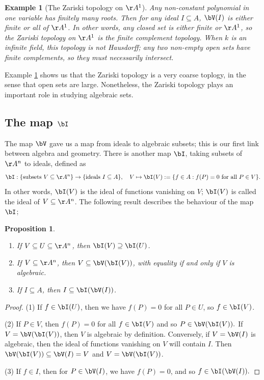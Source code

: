 \documentclass[12pt]{amsart}
\theoremstyle{plain}
\newtheorem{proposition}[theorem]{Proposition}
\newtheorem{example}[theorem]{Example}
\begin{document}
\begin{example}[The Zariski topology on $\AA^1$]\label{zariskia1}
Any non-constant polynomial in one variable has finitely many roots.
Then for any ideal $I \subseteq A$, $\bV(I)$ is either finite or all of $\AA^1$.
In other words, any closed set is either finite or $\AA^1$, so the Zariski topology on $\AA^1$ is the finite complement topology.
When $k$ is an infinite field, this topology is not Hausdorff; any two non-empty open sets have finite complements, so they must necessarily intersect.
\end{example}

Example \ref{zariskia1} shows us that the Zariski topology is a very coarse toplogy, in the sense that open sets are large.
Nonetheless, the Zariski topology plays an important role in studying algebraic sets.





\subsection{The map $\bI$}
The map $\bV$ gave us a map from ideals to algebraic subsets; this is our first link between algebra and geometry.
There is another map $\bI$, taking subsets of $\AA^n$ to ideals, defined as
$$\bI: \{\text{subsets } V \subseteq \AA^n\} \to \{\text{ideals } I \subseteq A\}, \quad V\mapsto \bI(V) := \{f \in A : f(P) = 0 \text{ for all } P \in V\}.$$
In other words, $\bI(V)$ is the ideal of functions vanishing on $V$; $\bI(V)$ is called the ideal of $V \subseteq \AA^n$.
The following result describes the behaviour of the map $\bI$;

\begin{proposition}\label{iproperties}
\begin{enumerate}
\item If $V \subseteq U \subseteq \AA^n$, then $\bI(V) \supseteq \bI(U)$.
\item If $V \subseteq \AA^n$, then $V \subseteq \bV(\bI(V))$, with equality if and only if $V$ is algebraic.
\item If $I \subseteq A$, then $I \subseteq \bI(\bV(I))$.
\end{enumerate}
\end{proposition}
\begin{proof}
(1) If $f \in \bI(U)$, then we have $f(P) = 0$ for all $P \in U$, so $f \in \bI(V)$.

(2) If $P \in V$, then $f(P) = 0$ for all $f \in \bI(V)$ and so $P \in \bV(\bI(V)).$
If $V = \bV(\bI(V))$, then $V$ is algebraic by definition.
Conversely, if $V = \bV(I)$ is algebraic, then the ideal of functions vanishing on $V$ will contain $I$.
Then $\bV(\bI(V)) \subseteq \bV(I) = V$ and $V = \bV(\bI(V))$.

(3) If $f \in I$, then for $P \in \bV(I)$, we have $f(P) = 0$, and so $f \in \bI(\bV(I)).$
\end{proof}
\end{document}
